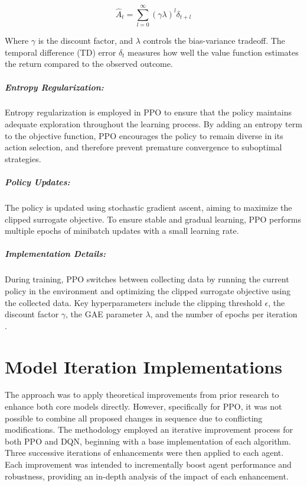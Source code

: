 \documentclass[
12pt, %
oneside, %
english, %
onehalfspacing, %
nolistspacing, %
liststotoc, %
headsepline, %
]{ProposalAndThesis} %
\begin{document}
\[ \hat{A}_t = \sum_{l=0}^\infty (\gamma \lambda)^l \delta_{t+l} \]
  
Where \( \gamma \) is the discount factor, and \( \lambda \) controls the bias-variance tradeoff. The temporal difference (TD) error \( \delta_t \) measures how well the value function estimates the return compared to the observed outcome.

\paragraph{Entropy Regularization:} Entropy regularization is employed in PPO to ensure that the policy maintains adequate exploration \parencite{stable-baselines3} throughout the learning process. By adding an entropy term to the objective function, PPO encourages the policy to remain diverse in its action selection, and therefore prevent premature convergence to suboptimal strategies.

\paragraph{Policy Updates:} The policy is updated using stochastic gradient ascent, aiming to maximize the clipped surrogate objective. To ensure stable and gradual learning, PPO performs multiple epochs of minibatch updates with a small learning rate. 

\paragraph{Implementation Details:} During training, PPO switches between collecting data by running the current policy in the environment and optimizing the clipped surrogate objective using the collected data. Key hyperparameters include the clipping threshold \( \epsilon \), the discount factor \( \gamma \), the GAE parameter \( \lambda \), and the number of epochs per iteration \parencite{stable-baselines3}.


\chapter{Model Iteration Implementations}
The approach was to apply theoretical improvements from prior research to enhance both core models directly. However, specifically for PPO, it was not possible to combine all proposed changes in sequence due to conflicting modifications. The methodology employed an iterative improvement process for both PPO and DQN, beginning with a base implementation of each algorithm. Three successive iterations of enhancements were then applied to each agent. Each improvement was intended to incrementally boost agent performance and robustness, providing an in-depth analysis of the impact of each enhancement.
\end{document}
